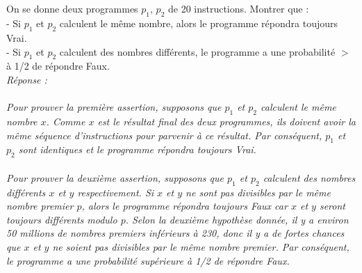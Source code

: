 \documentclass[a4paper,11pt]{article}
\begin{document}
        \subsection{}\label{subsec:Q7}
        On se donne deux programmes $p_1$, $p_2$ de 20 instructions. Montrer que :\\
- Si $p_1$ et $p_2$ calculent le même nombre, alors le programme répondra toujours Vrai.\\
- Si $p_1$ et $p_2$ calculent des nombres différents, le programme a une probabilité $>$ à 1/2 de répondre Faux.\\\textit{Réponse :\\\\
            Pour prouver la première assertion, supposons que $p_1$ et $p_2$ calculent le même nombre $x$. Comme $x$ est le résultat final des deux programmes, ils doivent avoir la même séquence d'instructions pour parvenir à ce résultat. Par conséquent, $p_1$ et $p_2$ sont identiques et le programme répondra toujours Vrai.\\\\
Pour prouver la deuxième assertion, supposons que $p_1$ et $p_2$ calculent des nombres différents $x$ et $y$ respectivement. Si $x$ et $y$ ne sont pas divisibles par le même nombre premier $p$, alors le programme répondra toujours Faux car $x$ et $y$ seront toujours différents modulo $p$. Selon la deuxième hypothèse donnée, il y a environ 50 millions de nombres premiers inférieurs à 230, donc il y a de fortes chances que $x$ et $y$ ne soient pas divisibles par le même nombre premier. Par conséquent, le programme a une probabilité supérieure à 1/2 de répondre Faux.}


    
\end{document}
